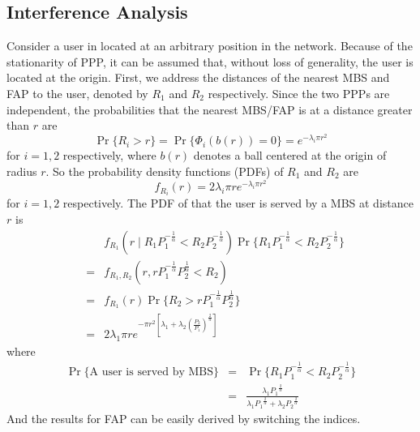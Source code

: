\documentclass[a4paper,twocolumn]{IEEEtran}
\begin{document}
\subsection{Interference Analysis}
Consider a user in located at an arbitrary position in the network. Because of the stationarity of PPP, it can be assumed that, without loss of generality, the user is located at the origin.
First, we address the distances of the nearest MBS and FAP to the user, denoted by $R_1$ and $R_2$ respectively. Since the two PPPs are independent, the probabilities that the nearest MBS/FAP is at a distance greater than $r$ are
\begin{displaymath}
\Pr\{ R_i > r \} = \Pr\{ \Phi_i(b(r)) =0\} = e^{-\lambda_i \pi r^2}
\end{displaymath}
for $i=1,2$ respectively, where $b(r)$ denotes a ball centered at the origin of radius $r$. So the probability density functions (PDFs) of $R_1$ and $R_2$ are
\begin{equation}
f_{R_i}(r) = 2\lambda_i \pi r e^{-\lambda_i \pi r^2}
\end{equation}
for $i=1,2$ respectively. The PDF of that the user is served by a MBS at distance $r$ is
\begin{eqnarray}\label{Eq:distance_dist}
&&f_{R_1}(r\mid R_1 P_1^{-\frac{1}{\alpha}} < R_2 P_2^{-\frac{1}{\alpha}}) \Pr\{R_1 P_1^{-\frac{1}{\alpha}} < R_2 P_2^{-\frac{1}{\alpha}}\}\nonumber\\
&=&f_{R_1,R_2}(r, r P_1^{-\frac{1}{\alpha}} P_2^{\frac{1}{\alpha}} < R_2)\nonumber\\
&=&f_{R_1}(r) \Pr\{ R_2 > r P_1^{-\frac{1}{\alpha}} P_2^{\frac{1}{\alpha}} \} \nonumber\\
&=&2\lambda_1 \pi r e^{- \pi r^2 [ \lambda_1 + \lambda_2 (\frac{P_2}{P_1})^\frac{2}{\alpha} ] }
\end{eqnarray}
where
\begin{eqnarray}\label{Eq:Prob_Serv}
\Pr\{\text{A user is served by MBS}\}&=&\Pr\{R_1 P_1^{-\frac{1}{\alpha}} < R_2 P_2^{-\frac{1}{\alpha}}\}\nonumber\\
&=&\frac{\lambda_1 {P_1}^\frac{2}{\alpha}}{\lambda_1 {P_1}^\frac{2}{\alpha} + \lambda_2 {P_2}^\frac{2}{\alpha}}
\end{eqnarray} 
And the results for FAP can be easily derived by switching the indices.
\end{document}
